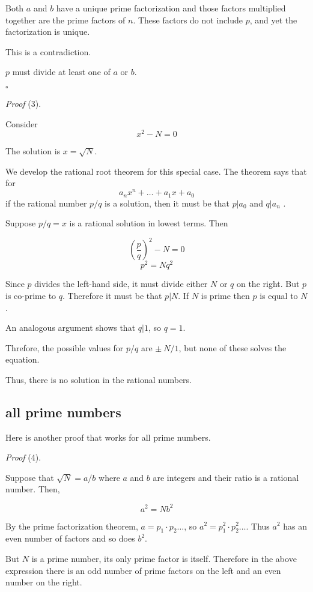 \documentclass[11pt, oneside]{article}
\begin{document}
Both $a$ and $b$ have a unique prime factorization and those factors multiplied together are the prime factors of $n$. These factors do not include $p$, and yet the factorization is unique. 

This is a contradiction.

$p$ must divide at least one of $a$ or $b$.

$\square$
 
\emph{Proof} (3).

Consider
\[ x^2 - N = 0 \]

The solution is $x = \sqrt{N}$.  

We develop the rational root theorem for this special case.  The theorem says that for
\[ a_n x^n + \dots + a_1 x + a_0 \]
if the rational number $p/q$ is a solution, then it must be that $p|a_0$ and $q|a_n$ .

Suppose $p/q = x$ is a rational solution in lowest terms.  Then

\[ (\frac{p}{q})^2 - N = 0 \]
\[ p^2 = Nq^2 \]

Since $p$ divides the left-hand side, it must divide either $N$ or $q$ on the right.  But $p$ is co-prime to $q$.  Therefore it must be that $p|N$.  If $N$ is prime then $p$ is equal to $N$.

An analogous argument shows that $q|1$, so $q = 1$.

Threfore, the possible values for $p/q$ are $\pm \ N/1$, but none of these solves the equation.

Thus, there is no solution in the rational numbers.

\subsection*{all prime numbers}

Here is another proof that works for all prime numbers.

\emph{Proof} (4).

Suppose that $\sqrt{N} = a/b$ where $a$ and $b$ are integers and their ratio is a rational number.  Then, 

\[ a^2 = N b^2 \]

By the prime factorization theorem, $a = p_1 \cdot p_2 \dots$, so $a^2 = p_1^2 \cdot p_2^2 \dots$. Thus $a^2$ has an even number of factors and so does $b^2$.

But $N$ is a prime number, its only prime factor is itself.  Therefore in the above expression there is an odd number of prime factors on the left and an even number on the right.  
\end{document}
